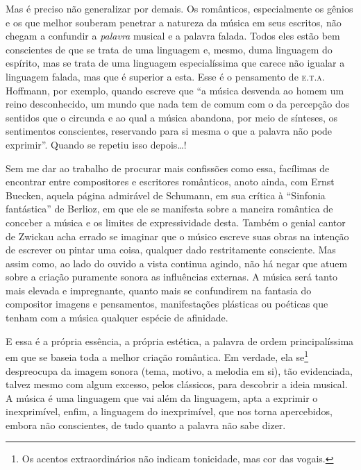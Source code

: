 Mas é preciso não generalizar por demais. Os românticos, especialmente
os gênios e os que melhor souberam penetrar a natureza da música em seus
escritos, não chegam a confundir a \textit{palavra} musical e a palavra
falada. Todos eles estão bem conscientes de que se trata de uma
linguagem e, mesmo, duma linguagem do espírito, mas se trata de uma
linguagem especialíssima que carece não igualar a linguagem falada, mas
que é superior a esta. Esse é o pensamento de \textsc{e.t.a.}\,Hoffmann, por
exemplo, quando escreve que ``a música desvenda ao homem um reino
desconhecido, um mundo que nada tem de comum com o da percepção dos
sentidos que o circunda e ao qual a música abandona, por meio de
sínteses, os sentimentos conscientes, reservando para si mesma o que a
palavra não pode exprimir''. Quando se repetiu isso depois\ldots{}!

Sem me dar ao trabalho de procurar mais confissões como essa, facílimas
de encontrar entre compositores e escritores românticos, anoto ainda,
com Ernst Buecken, aquela página admirável de Schumann, em sua crítica à
``Sinfonia fantástica'' de Berlioz, em que ele se manifesta sobre a
maneira romântica de conceber a música e os limites de expressividade
desta. Também o genial cantor de Zwickau acha errado se imaginar que o
músico escreve suas obras na intenção de escrever ou pintar uma coisa,
qualquer dado restritamente consciente. Mas assim como, ao lado do
ouvido a vista continua agindo, não há negar que atuem sobre a criação
puramente sonora as influências externas. A música será tanto mais
elevada e impregnante, quanto mais se confundirem na fantasia do
compositor imagens e pensamentos, manifestações plásticas ou poéticas
que tenham com a música qualquer espécie de afinidade.

E essa é a própria essência, a própria estética, a palavra de ordem
principalíssima em que se baseia toda a melhor criação romântica. Em
verdade, ela se\footnote{Os acentos extraordinários não indicam tonicidade, mas cor das
vogais.} despreocupa da imagem sonora (tema, motivo, a melodia
em si), tão evidenciada, talvez mesmo com algum excesso, pelos
clássicos, para descobrir a ideia musical. A música é uma linguagem que
vai além da linguagem, apta a exprimir o inexprimível, enfim, a
linguagem do inexprimível, que nos torna apercebidos, embora não
conscientes, de tudo quanto a palavra não sabe dizer.

